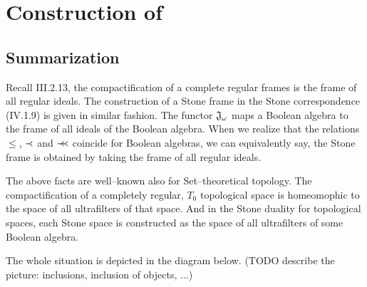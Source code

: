 \chapter{Construction of \R}

\section{Summarization}

Recall III.2.13, the compactification of a complete regular frames is the frame of all regular ideals. The construction of a Stone frame in the Stone correspondence (IV.1.9) is given in similar fashion. The functor $\mathfrak{J}_{\omega}$ maps a Boolean algebra to the frame of all ideals of the Boolean algebra. When we realize that the relations $\leq$, $\prec$ and $\prec\mkern-7mu\prec$ coincide for Boolean algebras, we can equivalently say, the Stone frame is obtained by taking the frame of all regular ideals.

The above facts are well--known also for Set--theoretical topology. The compactification of a completely regular, $T_0$ topological space is homeomophic to the space of all ultrafilters of that space. And in the Stone duality for topological spaces, each Stone space is constructed as the space of all ultrafilters of some Boolean algebra.

The whole situation is depicted in the diagram below. (TODO describe the picture: inclusions, inclusion of objects, ...)


